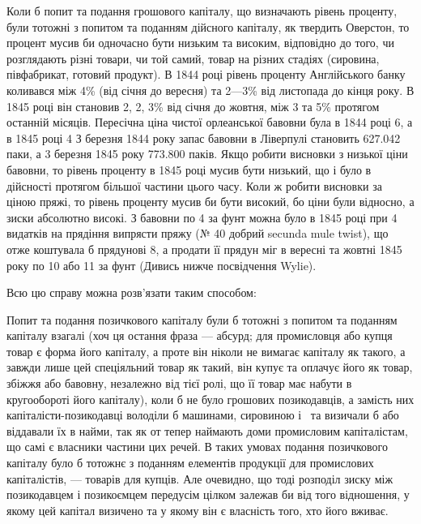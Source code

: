 Коли б попит та подання грошового капіталу, що визначають рівень
проценту, були тотожні з попитом та поданням дійсного капіталу, як твердить
Оверстон, то процент мусив би одночасно бути низьким та високим, відповідно до
того, чи розглядають різні товари, чи той самий, товар на різних стадіях (сировина,
півфабрикат, готовий продукт). В 1844 році рівень проценту Англійського банку
коливався між 4\% (від січня до вересня) та 2—3\% від листопада до
кінця року. В 1845 році він становив 2, 2, 3\% від січня до жовтня, між
3 та 5\% протягом останній місяців. Пересічна ціна чистої орлеанської бавовни
була в 1844 році 6, а в 1845 році 4 З березня 1844 року
запас бавовни в Ліверпулі становить \num{627.042} паки, а 3 березня 1845 року
\num{773.800} паків. Якщо робити висновки з низької ціни бавовни, то рівень проценту
в 1845 році мусив бути низький, що і було в дійсності протягом більшої
частини цього часу. Коли ж робити висновки за ціною пряжі, то рівень проценту
мусив би бути високий, бо ціни були відносно, а зиски абсолютно високі.
З бавовни по 4 за фунт можна було в 1845 році при 4 видатків
на прядіння випрясти пряжу (№ 40 добрий secunda mule twist), що отже коштувала
б прядунові 8, а продати її прядун міг в вересні та жовтні 1845 року
по 10 або 11 за фунт (Дивись нижче посвідчення Wylie).

Всю цю справу можна розв’язати таким способом:

Попит та подання позичкового капіталу були б тотожні з попитом та поданням
капіталу взагалі (хоч ця остання фраза — абсурд; для промисловця або
купця товар є форма його капіталу, а проте він ніколи не вимагає капіталу як
такого, а завжди лише цей спеціяльний товар як такий, він купує та оплачує
його як товар, збіжжя або бавовну, незалежно від тієї ролі, що її товар має
набути в кругообороті його капіталу), коли б не було грошових позикодавців,
а замість них капіталісти-позикодавці володіли б машинами, сировиною і~ та
визичали б або віддавали їх в найми, так як от тепер наймають доми промисловим
капіталістам, що самі є власники частини цих речей. В таких умовах
подання позичкового капіталу було б тотожнє з поданням елементів продукції
для промислових капіталістів, — товарів для купців. Але очевидно, що тоді розподіл
зиску між позикодавцем і позикоємцем передусім цілком залежав би від
того відношення, у якому цей капітал визичено та у якому він є власність
того, хто його вживає.

